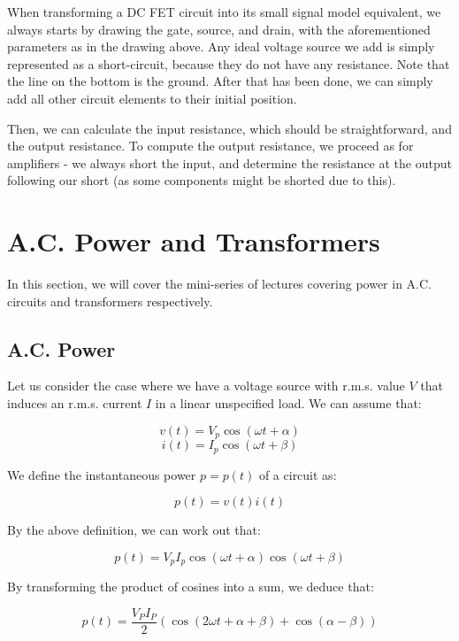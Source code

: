 \documentclass{article}
\begin{document}
When transforming a DC FET circuit into its small signal model equivalent, we always starts by drawing the gate, source, and drain, with the aforementioned parameters as in the drawing above. Any ideal voltage source we add is simply represented as a short-circuit, because they do not have any resistance. Note that the line on the bottom is the ground. After that has been done, we can simply add all other circuit elements to their initial position.

Then, we can calculate the input resistance, which should be straightforward, and the output resistance. To compute the output resistance, we proceed as for amplifiers - we always short the input, and determine the resistance at the output following our short (as some components might be shorted due to this).

\newpage

\section{A.C. Power and Transformers}

In this section, we will cover the mini-series of lectures covering power in A.C. circuits and transformers respectively.

\subsection{A.C. Power}

Let us consider the case where we have a voltage source with r.m.s. value $V$ that induces an r.m.s. current $I$ in a linear unspecified load. We can assume that:

\[ v(t) = V_p\cos{(\omega t + \alpha)} \]
\[ i(t) = I_p\cos{(\omega t + \beta)} \]

\begin{definition}
    We define the instantaneous power $p = p(t)$ of a circuit as:

    \[ p(t) = v(t)i(t) \]
\end{definition}

By the above definition, we can work out that:

\[ p(t) = V_pI_p\cos{(\omega t + \alpha)}\cos{(\omega t + \beta)} \]

By transforming the product of cosines into a sum, we deduce that:

\[ p(t) = \frac{V_PI_P}{2}(\cos{(2\omega t + \alpha + \beta)} + \cos{(\alpha - \beta)}) \]
\end{document}
